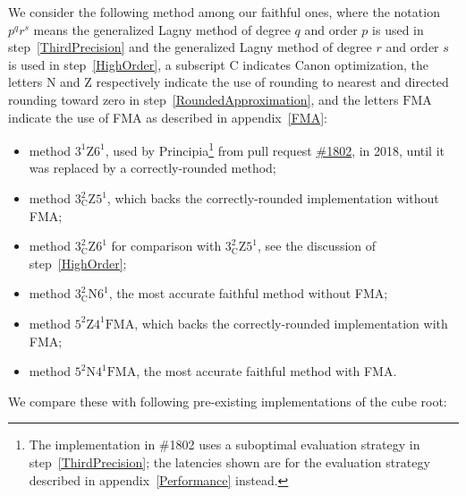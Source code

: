 ﻿\documentclass[10pt, a4paper, twoside]{basestyle}
\begin{document}
We consider the following method among our faithful ones, where the notation $p^qr^s$ means the generalized Lagny method of
degree $q$ and order $p$ is used in step~\ref{ThirdPrecision} and the generalized Lagny method of degree $r$ and order $s$
is used in step~\ref{HighOrder}, a subscript $\mathrm{C}$ indicates Canon optimization, the \cbstart{}letters $\mathrm{N}$ and $\mathrm{Z}$ respectively indicate the use of rounding to nearest and directed rounding toward zero in step~\ref{RoundedApproximation},
and the letters $\mathrm{FMA}$ indicate the use of FMA as described in appendix~\ref{FMA}:\cbend{}
\begin{itemize}[nosep]
\item method \cbstart{}$3^1\mathrm{Z}6^1$\cbend{}, used by Principia\footnote{The implementation in \#1802 uses a suboptimal evaluation strategy in step~\ref{ThirdPrecision}; the latencies shown are for the evaluation strategy described in appendix~\ref{Performance} instead.}
from pull request \href{https://github.com/mockingbirdnest/Principia/pull/1802}{\#1802},
in 2018, until it was replaced by a correctly-rounded method;
\item method \cbstart{}$3^2_{\mathrm{C}}\mathrm{Z}5^1$,\cbend{} which backs the correctly-rounded implementation without FMA;
\item method \cbstart{}$3^2_{\mathrm{C}}\mathrm{Z}6^1$\cbend{} for comparison with \cbstart{}$3^2_{\mathrm{C}}\mathrm{Z}5^1$,\cbend{} see the discussion of step~\ref{HighOrder};
\item method $3^2_{\mathrm{C}}\mathrm{N}6^1$, the most accurate faithful method without FMA;
\item method \cbstart{}$5^2\mathrm{Z}4^1\mathrm{FMA}$,\cbend{} which backs the correctly-rounded implementation with FMA;
\item method \cbstart{}$5^2\mathrm{N}4^1\mathrm{FMA}$,\cbend{} the most accurate faithful method with FMA.
\end{itemize}
We compare these with following pre-existing implementations of the cube root:
\end{document}
